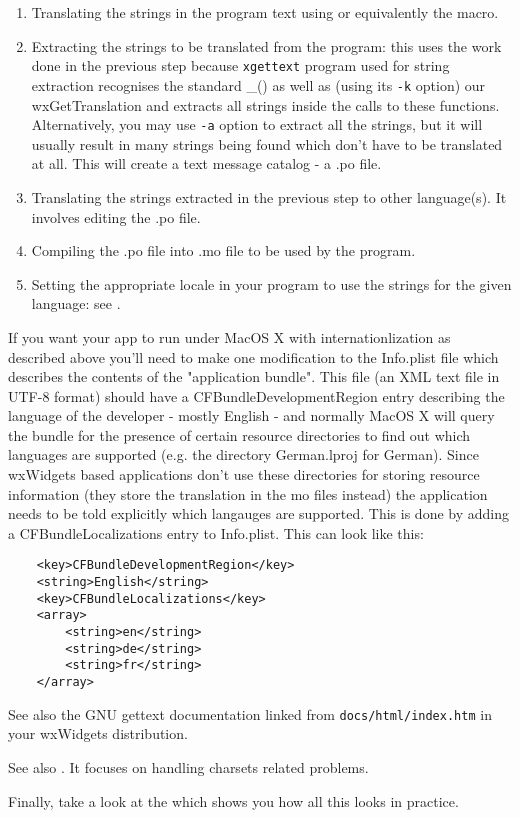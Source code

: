 \begin{enumerate}\itemsep=0pt
\item Translating the strings in the program text using 
 or equivalently the 
 macro.
\item Extracting the strings to be translated from the program: this uses the
work done in the previous step because {\tt xgettext} program used for string
extraction recognises the standard \_() as well as (using its {\tt -k} option)
our wxGetTranslation and extracts all strings inside the calls to these
functions. Alternatively, you may use {\tt -a} option to extract all the
strings, but it will usually result in many strings being found which don't
have to be translated at all. This will create a text message catalog - a .po
file.
\item Translating the strings extracted in the previous step to other
language(s). It involves editing the .po file.
\item Compiling the .po file into .mo file to be used by the program.
\item Setting the appropriate locale in your program to use the strings for the
given language: see .
\end{enumerate}

If you want your app to run under MacOS X with internationlization as
described above you'll need to make one modification to the Info.plist
file which describes the contents of the "application bundle". This
file (an XML text file in UTF-8 format) should have a
CFBundleDevelopmentRegion entry describing the language of the developer
- mostly English - and normally MacOS X will query the bundle for the
presence of certain resource directories to find out which languages
are supported (e.g. the directory German.lproj for German). 
Since wxWidgets based applications don't use these directories
for storing resource information (they store the translation in the
mo files instead) the application needs to be told explicitly which
langauges are supported. This is done by adding a CFBundleLocalizations
entry to Info.plist. This can look like this:

\begin{verbatim}
	<key>CFBundleDevelopmentRegion</key>
	<string>English</string>
	<key>CFBundleLocalizations</key>
	<array>
		<string>en</string>
		<string>de</string>
		<string>fr</string>
	</array>
\end{verbatim}

See also the GNU gettext documentation linked from {\tt docs/html/index.htm} in
your wxWidgets distribution.

See also .
It focuses on handling charsets related problems.

Finally, take a look at the  which shows
you how all this looks in practice.

